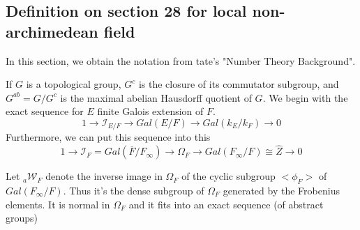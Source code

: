 \documentclass[12pt,a4paper,english]{article}
\theoremstyle{definition}
\theoremstyle{plain}
\begin{document}
\subsection{Definition on section 28 for local non-archimedean field}
In this section, we obtain the notation from tate's "Number Theory Background".

 If $G$ is a topological group, $G^{c}$ is the closure of its commutator subgroup, and $G^{ab}=G/G^{c}$ is the maximal abelian Hausdorff quotient of $G$. We begin with the exact sequence for $E$ finite Galois extension of $F$.  
\begin{equation*}
    1\rightarrow \mathcal{I}_{E/F}\rightarrow Gal(E/F) \rightarrow Gal(k_{E}/k_{F})\rightarrow 0
\end{equation*}
Furthermore, we can put this sequence into this
\begin{equation*}
    1\rightarrow \mathcal{I}_{F}=Gal(\overline{F}/F_{\infty})\rightarrow \Omega_{F}\rightarrow Gal(F_{\infty}/F)\cong \hat{Z}\rightarrow 0 
\end{equation*}




Let $_{a}{\mathcal{W}_{F}}$ denote the inverse image in $\Omega_{F}$ of the cyclic subgroup $<\phi_{F}>$ of $Gal(F_{\infty}/F)$. Thus it's the dense subgroup of $\Omega_{F}$ generated by the Frobenius elements. It is normal in $\Omega_{F}$ and it fits into an exact sequence (of abstract groups)

\begin{center}

    
\end{center}
\end{document}
